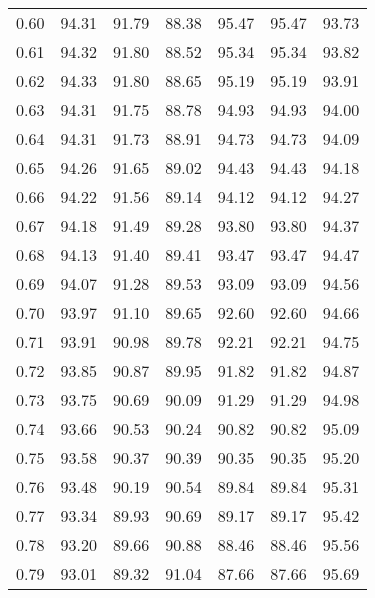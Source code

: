 \begin{tabular}{|c|c|c|c|c|c|c|}
      0.60 &     94.31 &     91.79 &      88.38 &   95.47 &      95.47 &         93.73 \\
      0.61 &     94.32 &     91.80 &      88.52 &   95.34 &      95.34 &         93.82 \\
      0.62 &     94.33 &     91.80 &      88.65 &   95.19 &      95.19 &         93.91 \\
      0.63 &     94.31 &     91.75 &      88.78 &   94.93 &      94.93 &         94.00 \\
      0.64 &     94.31 &     91.73 &      88.91 &   94.73 &      94.73 &         94.09 \\
      0.65 &     94.26 &     91.65 &      89.02 &   94.43 &      94.43 &         94.18 \\
      0.66 &     94.22 &     91.56 &      89.14 &   94.12 &      94.12 &         94.27 \\
      0.67 &     94.18 &     91.49 &      89.28 &   93.80 &      93.80 &         94.37 \\
      0.68 &     94.13 &     91.40 &      89.41 &   93.47 &      93.47 &         94.47 \\
      0.69 &     94.07 &     91.28 &      89.53 &   93.09 &      93.09 &         94.56 \\
      0.70 &     93.97 &     91.10 &      89.65 &   92.60 &      92.60 &         94.66 \\
      0.71 &     93.91 &     90.98 &      89.78 &   92.21 &      92.21 &         94.75 \\
      0.72 &     93.85 &     90.87 &      89.95 &   91.82 &      91.82 &         94.87 \\
      0.73 &     93.75 &     90.69 &      90.09 &   91.29 &      91.29 &         94.98 \\
      0.74 &     93.66 &     90.53 &      90.24 &   90.82 &      90.82 &         95.09 \\
      0.75 &     93.58 &     90.37 &      90.39 &   90.35 &      90.35 &         95.20 \\
      0.76 &     93.48 &     90.19 &      90.54 &   89.84 &      89.84 &         95.31 \\
      0.77 &     93.34 &     89.93 &      90.69 &   89.17 &      89.17 &         95.42 \\
      0.78 &     93.20 &     89.66 &      90.88 &   88.46 &      88.46 &         95.56 \\
      0.79 &     93.01 &     89.32 &      91.04 &   87.66 &      87.66 &         95.69 \\

\end{tabular}
